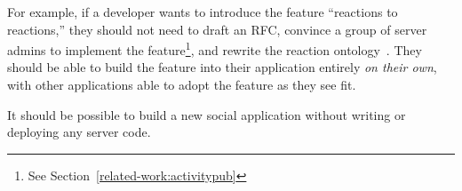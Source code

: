 For example, if a developer wants to introduce the feature
``reactions to reactions,'' they should not need to draft an RFC,
convince a group of server admins to implement the feature\footnote{
    See Section~\ref{related-work:activitypub}
},
and rewrite the reaction ontology~\cite{ecosystemmoving, herdingdnscamel, semanticwebtwodecades}.
They should be able to build the feature into their application
entirely \emph{on their own}, with other applications able to adopt the
feature as they see fit.




\begin{requirement}[Serverless]
\label{requirements:serverless}
    It should be possible to build a new social application without writing or deploying any server code.
\end{requirement}


